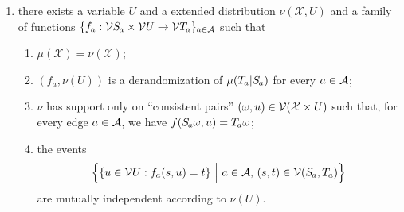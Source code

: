 \documentclass{article}
\newcommand{\X}{\mathcal X}
\begin{document}
\begin{defn}
\begin{enumerate}[label=\textbullet~\textit{q\arabic*-compatible} with $\Ar$ iff, labelwidth=-10em]
        \item 
% 
            
        there exists a variable $U$ and
        a extended distribution $\nu(\X, U)$ and
        a family of functions  
        $\{ f_a : \V\Src a \times \V U \to  \V\Tgt a\}_{a\in \Ar} $ such that
        \begin{enumerate}[label=(\alph*)]
            \item $\mu(\X) = \nu(\X)$;
            \item $(f_a, \nu(U))$ is a derandomization 
            of $\mu(\Tgt a | \Src a)$ for every $a \in \mathcal A$;
            \item $\nu$ has support only on ``consistent pairs'' $(\omega, u) \in \V(\X \times U)$
            such that, for every edge $a \in \mathcal A$, 
            we have $f(\Src a \omega, u) = \Tgt a \omega$;
            \item
            the events 
            \[ 
                \Big\{ \{ u \in \V U : f_a(s,u) = t \} 
                    ~\Big|~a \in \Ar,\, (s,t) \in \V(\Src a, \Tgt a) \Big\}
            \]
            are mutually independent according to $\nu(U)$. 
        \end{enumerate}

    \end{enumerate}
\end{defn}

\end{document}
